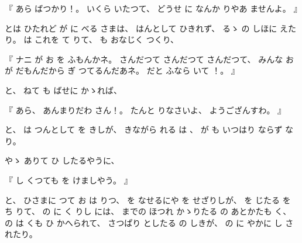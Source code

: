 
%
『
あら
ばつかり！。
%
いくら
いたつて、
%
どうせ
に
なんか
りやあ
ませんよ。
』

%
とは
ひたれど
が%
に
べる
さまは、
%
はんとして
ひきれず、
%
るゝ
の
しほに
えたり。
%
は
これを
て
りて、
%
も
おなじく
つくり、

%
『
ナニ
が
お
を
ふもんかネ。
%
さんだつて
さんだつて
さんだつて、
%
みんな
お
が
だもんだから
ぎ
つてるんだあネ。
%
だと
ふなら
いて
！。
』

%
と、
%
ねて
も
ばせに
かゝれば、

%
『
あら、
%
あんまりだわ
さん！。
%
たんと
りなさいよ、
%
ようござんすわ。
』

%
と、
%
は
つんとして
を
きしが、
%
きながら
れる
は%
、
%
%
が
も
いつはり
ならず
なり。%

%
やゝ
ありて
ひ
したるやうに、

%
『
し
くつても
を
けましやう。
』

%
と、
%
ひさまに
つて
お
は
りつ、
%
を
なせるにや
%
を
せざりしが、
%
を
じたる
を
ち
りて、
%
の
に
く
りし
には、
%
までの
ほつれ
かゝりたる
の
あとかたも
く、
%
の
は
くも
ひ
かへられて、
%
さつぱり
としたる
の
しきが、
%
の
に
やかに
し
されたり。

